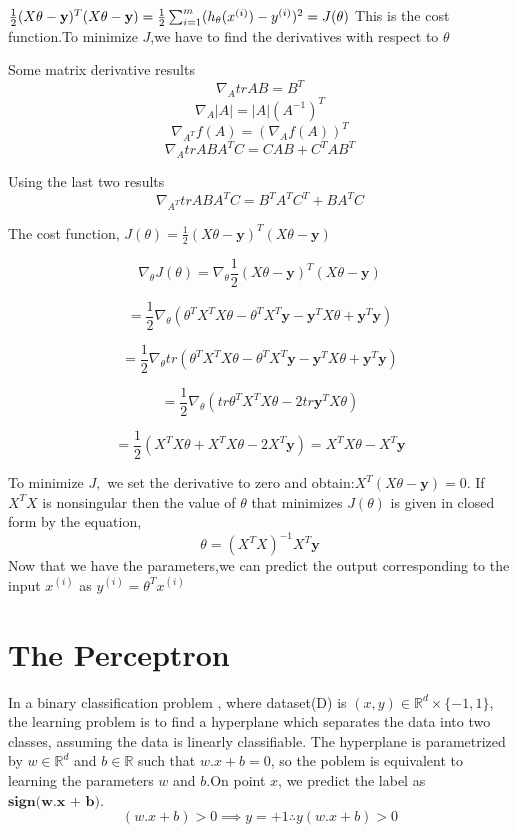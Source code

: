 \documentclass[12pt]{article}
\begin{document}
 
 $\frac{1}{2}(X\theta-\textbf y)^{T}(X\theta-\textbf y)=\frac{1}{2} \sum_{i=1}^{m}(h_{\theta}(x^{(i)})-y^{(i)})^{2}=J(\theta)$ This is the cost function.To minimize $J$,we have to find the derivatives with respect to $\theta$
 
 
 
 
Some matrix derivative results
 $$\nabla_{A}tr AB = B^{T}$$ 
 $$\nabla_{A}\vert A\vert=\vert A\vert(A^{-1})^{T}$$ 
 $$\nabla_{A^{T}}f(A)= (\nabla_{A}f(A))^{T}$$ 
 $$\nabla_{A}trABA^{T}C=CAB+C^{T}AB^{T}$$
 
 
 Using the last two results 
 $$\nabla_{A^{T}}trABA^{T}C=B^{T}A^{T}C^{T}+BA^{T}C$$
 
 
 
 The cost function,  $J(\theta)=\frac{1}{2}(X\theta-\textbf{y})^{T}(X\theta-\textbf{y})$
 
 
$$ \nabla_{\theta} J(\theta)  =\nabla_{\theta}\frac{1}{2}(X\theta-\textbf{y})^{T}(X\theta-\textbf{y}) $$
 
 
 
  $$=\frac{1}{2}\nabla_{\theta}(\theta^{T}X^{T}X\theta-\theta^{T}X^{T}\textbf{y}-\textbf{y}^{T}X\theta+\textbf{y}^{T}\textbf{y}) $$
 
 
 
$$ =\frac{1}{2}\nabla_{\theta} tr(\theta^{T}X^{T}X\theta-\theta^{T}X^{T}\textbf{y}-\textbf{y}^{T}X\theta+\textbf{y}^{T}\textbf{y}) $$
 
 
 
 
$$=\frac{1}{2}\nabla_{\theta}(tr \theta^{T}X^{T}X\theta-2tr\textbf{y}^{T}X\theta)  $$
 
 

$$=\frac{1}{2}(X^{T}X\theta+X^{T}X\theta-2X^{T}\textbf{y})  =X^{T}X\theta-X^{T}\textbf{y} $$







To minimize $J,$ we set the derivative to zero and obtain:$X^{T}(X\theta-\textbf{y})=0$. If $X^{T}X$ is nonsingular then the value of $\theta $ that minimizes $J(\theta)$ is given in closed form by the equation,
$$\theta=(X^{T}X)^{-1}X^{T}\textbf{y}$$
Now that we have the parameters,we can predict the output corresponding to the input $x^{(i)}$ as $y^{(i)}=\theta^{T}x^{(i)}$



\section{The Perceptron}
In a binary classification problem , where dataset(D) is  $(x,y) \in \mathbb{R}^{d} \times\{-1,1\}$, the  learning problem is to find a hyperplane which separates the data into two classes, 
 assuming the data is linearly classifiable. The hyperplane is parametrized by $w\in\mathbb{R}^{d}$ and $ b \in \mathbb{R}$ such that $w.x + b = 0 $, so the poblem is equivalent to learning  the parameters $w$ and $b$.On point $x$, we predict the label as $\textbf{sign(w.x + b)}$.\\
$$(w.x + b) > 0  \implies y = +1 \therefore y(w.x + b) > 0 $$
\end{document}
